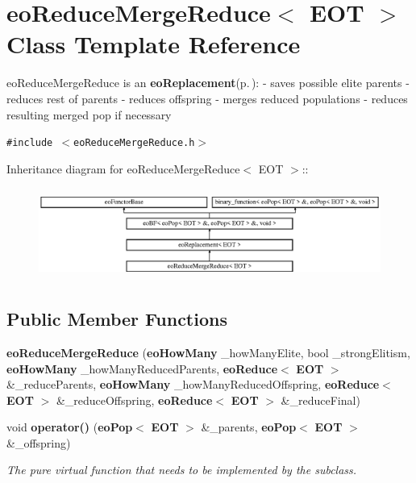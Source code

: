 \section{eo\-Reduce\-Merge\-Reduce$<$ EOT $>$ Class Template Reference}
\label{classeo_reduce_merge_reduce}
eo\-Reduce\-Merge\-Reduce is an {\bf eo\-Replacement}{\rm (p.\,\pageref{classeo_replacement})}: - saves possible elite parents - reduces rest of parents - reduces offspring - merges reduced populations - reduces resulting merged pop if necessary  


{\tt \#include $<$eo\-Reduce\-Merge\-Reduce.h$>$}

Inheritance diagram for eo\-Reduce\-Merge\-Reduce$<$ EOT $>$::\begin{figure}[H]
\begin{center}
\leavevmode
\includegraphics[height=3.01075cm]{classeo_reduce_merge_reduce}
\end{center}
\end{figure}
\subsection*{Public Member Functions}
\begin{CompactItemize}
\item 
{\bf eo\-Reduce\-Merge\-Reduce} ({\bf eo\-How\-Many} \_\-how\-Many\-Elite, bool \_\-strong\-Elitism, {\bf eo\-How\-Many} \_\-how\-Many\-Reduced\-Parents, {\bf eo\-Reduce}$<$ {\bf EOT} $>$ \&\_\-reduce\-Parents, {\bf eo\-How\-Many} \_\-how\-Many\-Reduced\-Offspring, {\bf eo\-Reduce}$<$ {\bf EOT} $>$ \&\_\-reduce\-Offspring, {\bf eo\-Reduce}$<$ {\bf EOT} $>$ \&\_\-reduce\-Final)\label{classeo_reduce_merge_reduce_a0}

\item 
void {\bf operator()} ({\bf eo\-Pop}$<$ {\bf EOT} $>$ \&\_\-parents, {\bf eo\-Pop}$<$ {\bf EOT} $>$ \&\_\-offspring)\label{classeo_reduce_merge_reduce_a1}

\begin{CompactList}\small\item\em The pure virtual function that needs to be implemented by the subclass. \item\end{CompactList}\end{CompactItemize}
